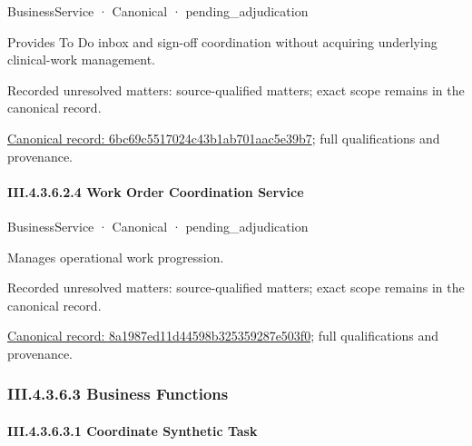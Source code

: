 \label{element:6bc69c5517024c43b1ab701aac5e39b7}
{\small BusinessService · Canonical · pending\_adjudication}\par

Provides To Do inbox and sign-off coordination without acquiring underlying clinical-work management.


{\small Recorded unresolved matters: source-qualified matters; exact scope remains in the canonical record.}\par
{\footnotesize \href{../../../../../../../continuum/business/business-service/6bc69c5517024c43b1ab701aac5e39b7.md}{Canonical record: 6bc69c5517024c43b1ab701aac5e39b7}; full qualifications and provenance.}\par
\paragraph*{III.4.3.6.2.4 Work Order Coordination Service}
\label{navigation:III.4.3.6.2.4}

\label{element:8a1987ed11d44598b325359287e503f0}
{\small BusinessService · Canonical · pending\_adjudication}\par

Manages operational work progression.


{\small Recorded unresolved matters: source-qualified matters; exact scope remains in the canonical record.}\par
{\footnotesize \href{../../../../../../../continuum/business/business-service/8a1987ed11d44598b325359287e503f0.md}{Canonical record: 8a1987ed11d44598b325359287e503f0}; full qualifications and provenance.}\par
\subsubsection*{III.4.3.6.3 Business Functions}
\label{navigation:III.4.3.6.3}

\paragraph*{III.4.3.6.3.1 Coordinate Synthetic Task}
\label{navigation:III.4.3.6.3.1}


